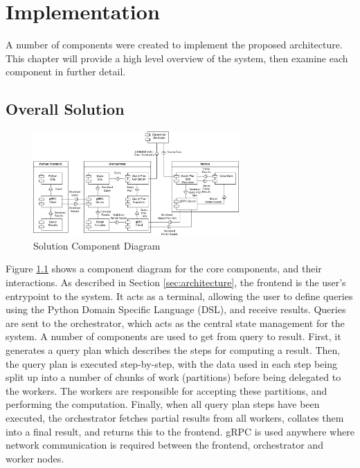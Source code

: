 \chapter{Implementation}\label{cha:implementation}

A number of components were created to implement the proposed architecture. This chapter will provide a high level overview of the system, then examine each component in further detail.

\section{Overall Solution}
\begin{figure}[h]
	\centering
	\includegraphics[width=0.7\textwidth]{chapters/diagrams/implementation/component-architecture-diagram}
	\caption{Solution Component Diagram}
	\label{fig:component-architecture-diagram}
\end{figure}

Figure \ref{fig:component-architecture-diagram} shows a component diagram for the core components, and their interactions. As described in Section \ref{sec:architecture}, the frontend is the user's entrypoint to the system. It acts as a terminal, allowing the user to define queries using the Python Domain Specific Language (DSL), and receive results. Queries are sent to the orchestrator, which acts as the central state management for the system. A number of components are used to get from query to result. First, it generates a query plan which describes the steps for computing a result. Then, the query plan is executed step-by-step, with the data used in each step being split up into a number of chunks of work (partitions) before being delegated to the workers. The workers are responsible for accepting these partitions, and performing the computation. Finally, when all query plan steps have been executed, the orchestrator fetches partial results from all workers, collates them into a final result, and returns this to the frontend. gRPC is used anywhere where network communication is required between the frontend, orchestrator and worker nodes.

